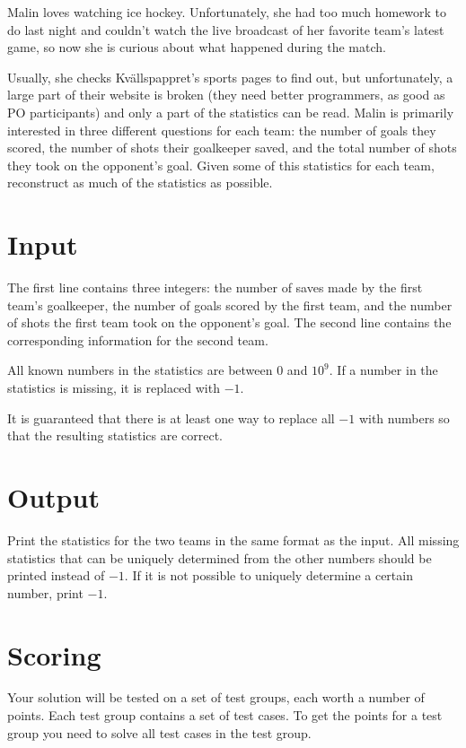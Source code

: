 \noindent
Malin loves watching ice hockey. 
Unfortunately, she had too much homework to do last night and couldn't watch the live broadcast of her favorite team's latest game, so now she is curious about what happened during the match.

Usually, she checks Kvällspappret's sports pages to find out, but unfortunately, 
a large part of their website is broken (they need better programmers, as good as PO participants) and only a part of the statistics can be read. 
Malin is primarily interested in three different questions for each team: the number of goals they scored, the number of shots their goalkeeper saved, and the total number of shots they took on the opponent's goal. 
Given some of this statistics for each team, reconstruct as much of the statistics as possible.

\section*{Input}
The first line contains three integers: the number of saves made by the first team's goalkeeper, the number of goals scored by the first team, and the number of shots the first team took on the opponent's goal.
The second line contains the corresponding information for the second team.

All known numbers in the statistics are between $0$ and $10^9$.
If a number in the statistics is missing, it is replaced with $-1$.

It is guaranteed that there is at least one way to replace all $-1$ with numbers so that the resulting statistics are correct.

\section*{Output}
Print the statistics for the two teams in the same format as the input.
All missing statistics that can be uniquely determined from the other numbers should be printed instead of $-1$.
If it is not possible to uniquely determine a certain number, print $-1$.

\section*{Scoring}
Your solution will be tested on a set of test groups, each worth a number of points. Each test group contains
a set of test cases. To get the points for a test group you need to solve all test cases in the test group.

